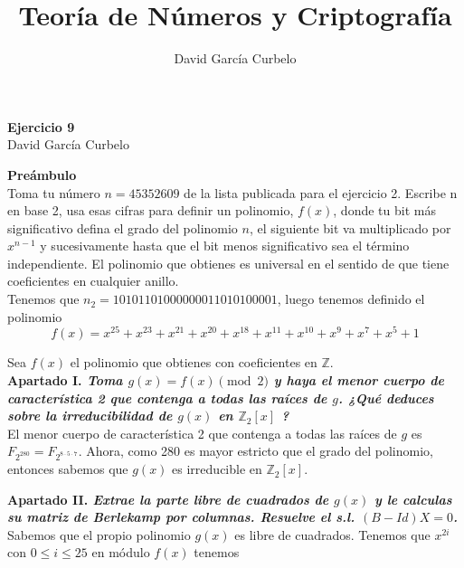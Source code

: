 \documentclass[fleqn]{article}
\author{David García Curbelo}
\title{Teoría de Números y Criptografía}
\def\Z{\mathds{Z}}
\begin{document}
    \begin{center}
        \LARGE{\textbf{Ejercicio 9}} \\
        \Large{David García Curbelo} \\
    \end{center}

    \vspace{1cm}

    \textbf{Preámbulo} \\
    Toma tu número $n=45352609$ de la lista publicada para el ejercicio 2.
    Escribe n en base 2, usa esas cifras para definir un polinomio, $f(x)$, donde tu bit más significativo
    defina el grado del polinomio $n$, el siguiente bit va multiplicado por $x^{n-1}$ y sucesivamente hasta 
    que el bit menos significativo sea el término independiente. El polinomio que obtienes es universal en el
    sentido de que tiene coeficientes en cualquier anillo.\\

    Tenemos que $n_2 = 10101101000000011010100001$, luego tenemos definido el polinomio 
    $$f(x) = x^{25} + x^{23} + x^{21} + x^{20} + x^{18} + x^{11} + x^{10} + x^{9} + x^{7} + x^{5} + 1$$

    \newpage
    Sea $f(x)$ el polinomio que obtienes con coeficientes en $\Z$.\\ 

    \textbf{Apartado I. \textit{Toma $g(x) = f(x) \pmod{2}$ y haya el menor cuerpo de característica 2 que contenga
                                a todas las raíces de $g$. ¿Qué deduces sobre la irreducibilidad de $g(x)$ en $\Z_2[x]$ ?}}\\
    El menor cuerpo de característica 2 que contenga a todas las raíces de $g$ es $F_{2^{280}} = F_{2^{8 \cdot 5 \cdot 7}}$.
    Ahora, como 280 es mayor estricto que el grado del polinomio, entonces sabemos que $g(x)$ es irreducible en $\Z_2[x]$.

    \newpage
    \textbf{Apartado II. \textit{Extrae la parte libre de cuadrados de $g(x)$ y le calculas su matriz de Berlekamp por
                                columnas. Resuelve el s.l. $(B - Id)X = 0$.}}\\
    Sabemos que el propio polinomio $g(x)$ es libre de cuadrados. Tenemos que $x^{2i}$ con $0 \leq i \leq 25$ en módulo $f(x)$ tenemos
\end{document}
